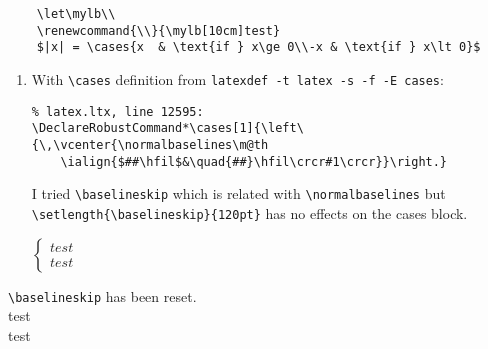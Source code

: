 \documentclass{article}
\begin{document}
\begin{enumerate}
\begin{verbatim}
    \let\mylb\\
    \renewcommand{\\}{\mylb[10cm]test}
    $|x| = \cases{x  & \text{if } x\ge 0\\-x & \text{if } x\lt 0}$
\end{verbatim}
          \begin{enumerate}
              \item With \verb|\cases| definition from \verb|latexdef -t latex -s -f -E cases|:
                    \begin{verbatim}
% latex.ltx, line 12595:
\DeclareRobustCommand*\cases[1]{\left\{\,\vcenter{\normalbaselines\m@th
    \ialign{$##\hfil$&\quad{##}\hfil\crcr#1\crcr}}\right.}
\end{verbatim}

                    \setlength{\baselineskip}{12pt}
                    I tried \verb|\baselineskip| which is related with \verb|\normalbaselines| but \verb|\setlength{\baselineskip}{120pt}| has no effects on the cases block.

                    $\begin{cases}
                            test \\
                            test
                        \end{cases}$
                    \addtolength{\jot}{1em}
          \end{enumerate}
\end{enumerate}
\setlength{\baselineskip}{12pt}
\verb|\baselineskip| has been reset. \\
test\\test
\end{document}

